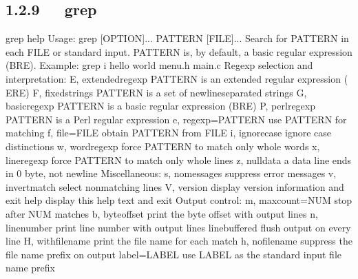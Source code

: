 \documentclass[letterpaper,12pt,english]{sphinxmanual}
\begin{document}
\subsection{1.2.9   grep}
\label{\detokenize{001software/001install/linux:grep}}
\begin{sphinxVerbatim}[commandchars=\\\{\}]
\PYGZdl{} grep \PYGZhy{}\PYGZhy{}help
Usage: grep [OPTION]... PATTERN [FILE]...
Search for PATTERN in each FILE or standard input.
PATTERN is, by default, a basic regular expression (BRE).
Example: grep \PYGZhy{}i \PYGZsq{}hello world\PYGZsq{} menu.h main.c
Regexp selection and interpretation:
  \PYGZhy{}E, \PYGZhy{}\PYGZhy{}extended\PYGZhy{}regexp     PATTERN is an extended regular expression (   ERE)
  \PYGZhy{}F, \PYGZhy{}\PYGZhy{}fixed\PYGZhy{}strings       PATTERN is a set of newline\PYGZhy{}separated strings
  \PYGZhy{}G, \PYGZhy{}\PYGZhy{}basic\PYGZhy{}regexp        PATTERN is a basic regular expression (BRE)
  \PYGZhy{}P, \PYGZhy{}\PYGZhy{}perl\PYGZhy{}regexp         PATTERN is a Perl regular expression
  \PYGZhy{}e, \PYGZhy{}\PYGZhy{}regexp=PATTERN      use PATTERN for matching
  \PYGZhy{}f, \PYGZhy{}\PYGZhy{}file=FILE           obtain PATTERN from FILE
  \PYGZhy{}i, \PYGZhy{}\PYGZhy{}ignore\PYGZhy{}case         ignore case distinctions
  \PYGZhy{}w, \PYGZhy{}\PYGZhy{}word\PYGZhy{}regexp         force PATTERN to match only whole words
  \PYGZhy{}x, \PYGZhy{}\PYGZhy{}line\PYGZhy{}regexp         force PATTERN to match only whole lines
  \PYGZhy{}z, \PYGZhy{}\PYGZhy{}null\PYGZhy{}data           a data line ends in 0 byte, not newline
Miscellaneous:
  \PYGZhy{}s, \PYGZhy{}\PYGZhy{}no\PYGZhy{}messages         suppress error messages
  \PYGZhy{}v, \PYGZhy{}\PYGZhy{}invert\PYGZhy{}match        select non\PYGZhy{}matching lines
  \PYGZhy{}V, \PYGZhy{}\PYGZhy{}version             display version information and exit
      \PYGZhy{}\PYGZhy{}help                display this help text and exit
Output control:
  \PYGZhy{}m, \PYGZhy{}\PYGZhy{}max\PYGZhy{}count=NUM       stop after NUM matches
  \PYGZhy{}b, \PYGZhy{}\PYGZhy{}byte\PYGZhy{}offset         print the byte offset with output lines
  \PYGZhy{}n, \PYGZhy{}\PYGZhy{}line\PYGZhy{}number         print line number with output lines
      \PYGZhy{}\PYGZhy{}line\PYGZhy{}buffered       flush output on every line
  \PYGZhy{}H, \PYGZhy{}\PYGZhy{}with\PYGZhy{}filename       print the file name for each match
  \PYGZhy{}h, \PYGZhy{}\PYGZhy{}no\PYGZhy{}filename         suppress the file name prefix on output
      \PYGZhy{}\PYGZhy{}label=LABEL         use LABEL as the standard input file name    prefix

\end{sphinxVerbatim}
\end{document}
